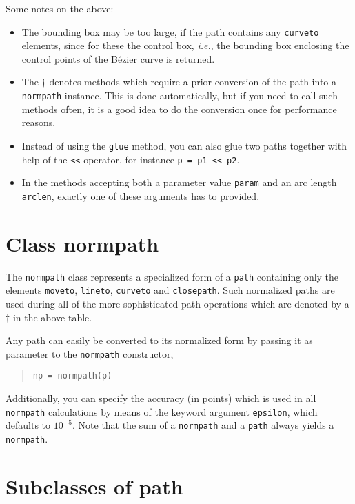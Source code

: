 Some notes on the above:
\begin{itemize}
\item The bounding box may be too large, if the path contains any
  \texttt{curveto} elements, since for these the control box,
  \textit{i.e.}, the bounding box enclosing the control points of
  the B\'ezier curve is returned.
\item The $\dagger$ denotes methods which require a prior
  conversion of the path into a \verb|normpath| instance. This is
  done automatically, but if you need to call such methods often,
  it is a good idea to do the conversion once for performance reasons.
\item Instead of using the \verb|glue| method, you can also glue two
paths together with help of the \verb|<<| operator, for instance
\verb|p = p1 << p2|.
\item In the methods accepting both a parameter value \verb|param| and
  an arc length \verb|arclen|, exactly one of these arguments has to
  provided.
\end{itemize}

\section{Class normpath}

The \texttt{normpath} class represents a specialized form of a
\texttt{path} containing only the elements \verb|moveto|,
\verb|lineto|, \verb|curveto| and \verb|closepath|. Such normalized
paths are used during all of the more sophisticated path operations
which are denoted by a $\dagger$ in the above table.


Any path can easily be converted to its normalized form by passing it
as parameter to the \texttt{normpath} constructor,
\begin{quote}
\begin{verbatim}
np = normpath(p)
\end{verbatim}
\end{quote}
Additionally, you can specify the accuracy (in points) which is used
in all \verb|normpath| calculations by means of the keyword argument
\verb|epsilon|, which defaults to $10^{-5}$.  Note that the sum of a
\verb|normpath| and a \verb|path| always yields a \verb|normpath|.

\section{Subclasses of path}

